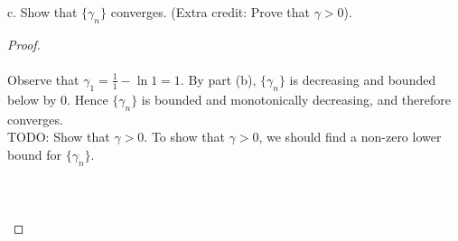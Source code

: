     \pagebreak

c.  Show that $\{\gamma_n\}$ converges. (Extra credit: Prove that $\gamma > 0$).

    \begin{proof}\renewcommand{\qedsymbol}{}\ \\\\
        Observe that $\gamma_1 = \frac{1}{1} - \ln{1} = 1$. By part (b),
        $\{\gamma_n\}$ is decreasing and bounded below by 0. Hence 
        $\{\gamma_n\}$ is bounded and monotonically decreasing, and therefore
        converges.
        \\

        TODO: Show that $\gamma > 0$. To show that $\gamma > 0$, we should find a
        non-zero lower bound for $\{\gamma_n\}$.

        \begin{align*}
        \end{align*}
        \\\\
    \end{proof}